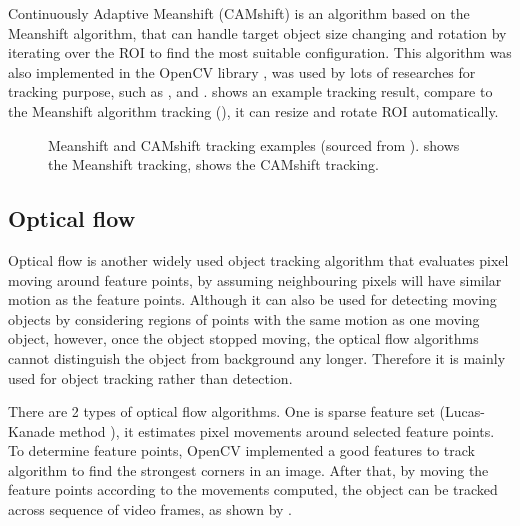 
Continuously Adaptive Meanshift (CAMshift) \cite{bradski1998computer} is an algorithm based on the Meanshift algorithm, that can handle target object size changing and rotation by iterating over the ROI to find the most suitable configuration. This algorithm was also implemented in the OpenCV library \cite{opencv:camshift}, was used by lots of researches for tracking purpose, such as \cite{chu2007object}, \cite{xu2012moving} and \cite{nouar2006improved}.  shows an example tracking result, compare to the Meanshift algorithm tracking (), it can resize and rotate ROI automatically.

\begin{figure}[H]
  \centering
  \caption{Meanshift and CAMshift tracking examples (sourced from \cite{opencv:camshift}).  shows the Meanshift tracking,  shows the CAMshift tracking.}
  \label{bg:ms}
\end{figure}


\subsection {Optical flow}


Optical flow is another widely used object tracking algorithm that evaluates pixel moving around feature points, by assuming neighbouring pixels will have similar motion as the feature points. Although it can also be used for detecting moving objects by considering regions of points with the same motion as one moving object, however, once the object stopped moving, the optical flow algorithms cannot distinguish the object from background any longer. Therefore it is mainly used for object tracking rather than detection.

There are 2 types of optical flow algorithms. One is sparse feature set (Lucas-Kanade method \cite{bouguet2001pyramidal}), it estimates pixel movements around selected feature points. To determine feature points, OpenCV implemented a good features to track \cite{shi1994good} algorithm to find the strongest corners in an image. After that, by moving the feature points according to the movements computed, the object can be tracked across sequence of video frames, as shown by .

